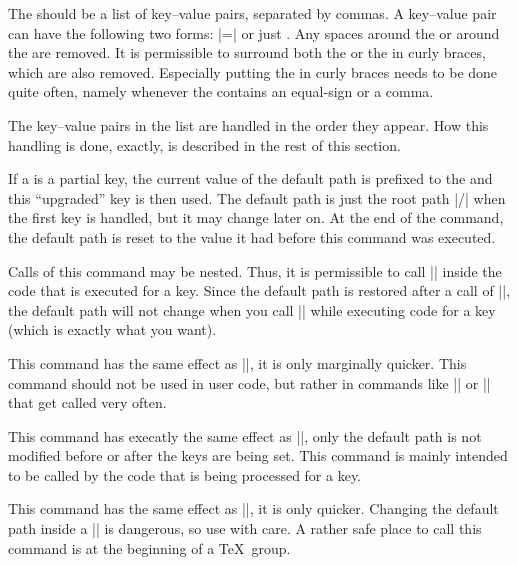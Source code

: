 \begin{command}{\pgfkeys{}}
  The  should be a list of key--value pairs, separated
  by commas. A key--value pair can have the following two forms:
  |=| or just . Any spaces around the
   or around the  are removed. It is permissible
  to surround both the  or the  in curly braces,
  which are also removed. Especially putting the  in curly
  braces needs to be done quite often, namely whenever the 
  contains an equal-sign or a comma.

  The key--value pairs in the list are handled in the order they
  appear. How this handling is done, exactly, is described in the rest
  of this section.

  If a  is a partial key, the current value of the default
  path is prefixed to the  and this ``upgraded'' key is
  then used. The default path is just the root path |/| when the first
  key is handled, but it may change later on. At the end of the
  command, the default path is reset to the value it had before this
  command was executed. 
  
  Calls of this command may be nested. Thus, it is permissible to call
  |\pgfkeys| inside the code that is executed for a key. Since the
  default path is restored after a call of |\pgfkeys|, the default
  path will not change when you call |\pgfkeys| while executing code
  for a key (which is exactly what you want).
\end{command}

\begin{command}{\pgfqkeys{}}
  This command has the same effect as ||, it is only marginally
  quicker. This command should not be used in user code, but rather in
  commands like |\tikzset| or |\pgfset| that get called very often.   
\end{command}

\begin{command}{\pgfkeysalso{}}
  This command has execatly the same effect as |\pgfkeys|, only the
  default path is not modified before or after the keys are being
  set. This command is mainly intended to be called by the code that
  is being processed for a key.
\end{command}

\begin{command}{\pgfqkeysalso{}}
  This command has the same effect as ||, it is only quicker. Changing the
  default path inside a |\pgfkeyalso| is dangerous, so use with
  care. A rather safe place to call this command is at the beginning
  of a \TeX\ group.
\end{command}



